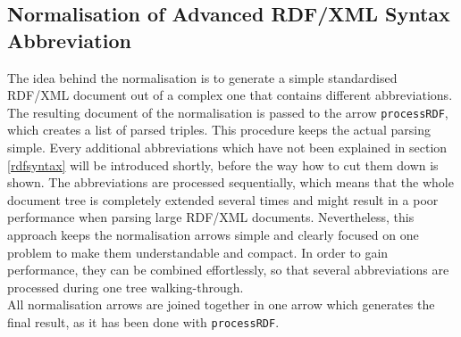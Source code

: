 \documentclass[11pt,a4paper,headsepline, bibtotoc]{scrreprt}
\begin{document}
\subsection{Normalisation of Advanced RDF/XML Syntax Abbreviation}
The idea behind the normalisation is to generate a simple standardised RDF/XML document out of a complex one that contains different abbreviations. The resulting document of the normalisation is passed to the arrow \texttt{processRDF}, which creates a list of parsed triples. This procedure keeps the actual parsing simple. Every additional abbreviations which have not been explained in section \ref{rdfsyntax} will be introduced shortly, before the way how to cut them down is shown. The abbreviations are processed sequentially, which means that the whole document tree is completely extended several times and might result in a poor performance when parsing large RDF/XML documents. Nevertheless, this approach keeps the normalisation arrows simple and clearly focused on one problem to make them understandable and compact. In order to gain performance, they can be combined effortlessly, so that several abbreviations are processed during one tree walking-through.\\
All normalisation arrows are joined together in one arrow which generates the final result, as it has been done with \texttt{processRDF}.
\end{document}
